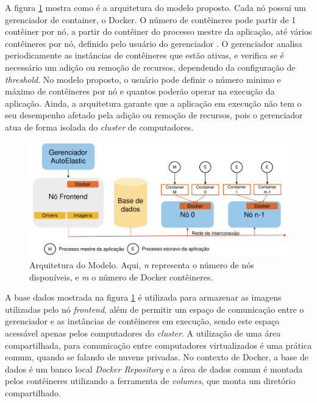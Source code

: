 \documentclass[twoside,english,brazilian]{UNISINOSartigo}
\begin{document}
A figura \ref{fig:arquitetura} mostra como é a arquitetura do modelo proposto. Cada nó possui um gerenciador de container, o Docker. O número de contêineres pode partir de 1 contêiner por nó, a partir do contêiner do processo mestre da aplicação, até vários contêineres por nó, definido pelo usuário do gerenciador \cite{6307065}. O gerenciador analisa periodicamente as instâncias de contêineres que estão ativas, e verifica se é necessário um adição ou remoção de recursos, dependendo da configuração de \textit{threshold}. No modelo proposto, o usuário pode definir o número minimo e máximo de contêineres por nó e quantos poderão operar na execução da aplicação. Ainda, a arquitetura garante que a aplicação em execução não tem o seu desempenho afetado pela adição ou remoção de recursos, pois o gerenciador atua de forma isolada do \textit{cluster} de computadores. 
\begin{figure}
	\caption{Arquitetura do Modelo. Aqui, \textit{n} representa o número de nós disponíveis, e \textit{m} o número de Docker contêineres.}
	\label{fig:arquitetura}
	\centering%
	\vspace{-0.5\baselineskip}
	\begin{minipage}{0.8\textwidth}
		\includegraphics[width=\textwidth]{images/arquitetura}
	\end{minipage}
\end{figure}
A base dados mostrada na figura \ref{fig:arquitetura} é utilizada para armazenar as imagens utilizadas pelo nó \textit{frontend}, além de permitir um espaço de comunicação entre o gerenciador e as instâncias de contêineres em execução, sendo este espaço acessável apenas pelos computadores do \textit{cluster}. A utilização de uma área compartilhada, para comunicação entre computadores virtualizados é uma prática comum, quando se falando de nuvens privadas. No contexto de Docker, a base de dados é um banco local \textit{Docker Repository} e a área de dados comum é montada pelos contêineres utilizando a ferramenta de \textit{volumes}, que monta um diretório compartilhado.
\end{document}
